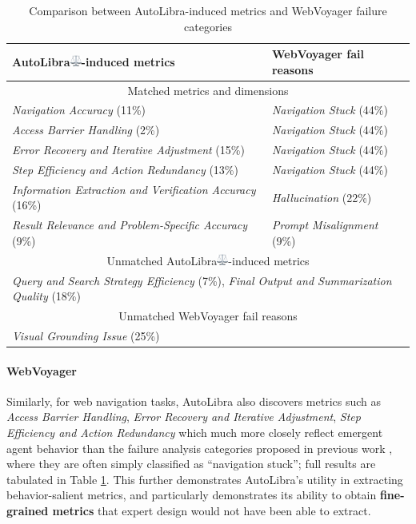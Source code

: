 \begin{table}[!h]
\centering
\begin{tabular}{ll}
    \toprule
    AutoLibra\protect\includegraphics[height=1em]{figs/scale.png}-induced metrics & WebVoyager fail reasons\\
    \midrule
    \multicolumn{2}{c}{Matched metrics and dimensions}\\\midrule
    \textit{Navigation Accuracy} (11\%) & \textit{Navigation Stuck} (44\%) \\ 
    \textit{Access Barrier Handling} (2\%) & \textit{Navigation Stuck} (44\%)\\
    \textit{Error Recovery and Iterative Adjustment} (15\%) & \textit{Navigation Stuck} (44\%)\\
    \textit{Step Efficiency and Action Redundancy} (13\%) & \textit{Navigation Stuck} (44\%)\\ 
    \textit{Information Extraction and Verification Accuracy} (16\%) & \textit{Hallucination} (22\%)\\
    \textit{Result Relevance and Problem-Specific Accuracy} (9\%) & \textit{Prompt Misalignment} (9\%)\\
    \midrule
    \multicolumn{2}{c}{Unmatched AutoLibra\protect\includegraphics[height=1em]{figs/scale.png}-induced metrics}\\\midrule
     \multicolumn{2}{C{0.8\textwidth}}{\textit{Query and Search Strategy Efficiency} (7\%), \textit{Final Output and Summarization Quality} (18\%)} \\ \midrule
     \multicolumn{2}{c}{Unmatched WebVoyager fail reasons}\\\midrule
     \multicolumn{2}{C{0.8\textwidth}}{\textit{Visual Grounding Issue} (25\%)} \\\bottomrule
\end{tabular}
\caption{Comparison between AutoLibra-induced metrics and WebVoyager failure categories}
\label{tab:lens_wv}
\end{table}

\paragraph{WebVoyager} Similarly, for web navigation tasks, AutoLibra also discovers metrics such as \textit{Access Barrier Handling}, \textit{Error Recovery and Iterative Adjustment}, \textit{Step Efficiency and Action Redundancy} which much more closely reflect emergent agent behavior than the failure analysis categories proposed in previous work \citep{he2024webvoyager,zhou2024proposeragentevaluatorpaeautonomousskilldiscovery}, where they are often simply classified as ``navigation stuck''; full results are tabulated in Table \ref{tab:lens_wv}. This further demonstrates AutoLibra's utility in extracting behavior-salient metrics, and particularly demonstrates its ability to obtain \textbf{fine-grained metrics} that expert design would not have been able to extract. 



